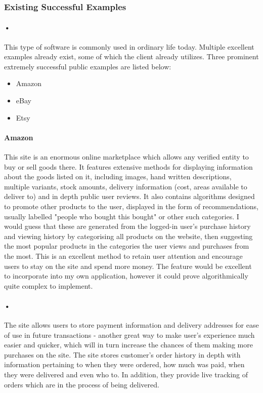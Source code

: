 ﻿\documentclass{article}
\begin{document}
    \subsubsection{Existing Successful Examples}
    \paragraph{•}
    This type of software is commonly used in ordinary life today.
    Multiple excellent examples already exist, some of which the client already utilizes.
    Three prominent extremely successful public examples are listed below:
    \begin{itemize}
    \item Amazon
    \item eBay
    \item Etsy
    \end{itemize}
    \paragraph{Amazon}
    This site is an enormous online marketplace which allows any verified entity to buy or sell goods there.
    It features extensive methods for displaying information about the goods listed on it, including images, hand written descriptions, multiple variants, stock amounts, delivery information (cost, areas available to deliver to) and in depth public user reviews.
    It also contains algorithms designed to promote other products to the user, displayed in the form of recommendations, usually labelled "people who bought this bought" or other such categories.
    I would guess that these are generated from the logged-in user's purchase history and viewing history by categorising all products on the website, then suggesting the most popular products in the categories the user views and purchases from the most.
    This is an excellent method to retain user attention and encourage users to stay on the site and spend more money.
    The feature would be excellent to incorporate into my own application, however it could prove algorithmically quite complex to implement.
    \paragraph{•}
    The site allows users to store payment information and delivery addresses for ease of use in future transactions - another great way to make user's experience much easier and quicker, which will in turn increase the chances of them making more purchases on the site.
    The site stores customer's order history in depth with information pertaining to when they were ordered, how much was paid, when they were delivered and even who to.
    In addition, they provide live tracking of orders which are in the process of being delivered.
\end{document}
